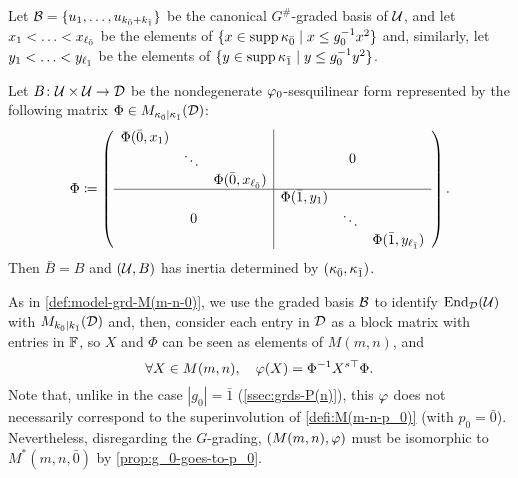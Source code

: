 Let $\mathcal B = \{u_1, \ldots, u_{k_{\bar{0}} + k_{\bar{1}}} \}$ be the canonical $G^\#$-graded basis of $\mathcal U$, and 
let $x_1 < \ldots < x_{\ell_{\bar{0}}}$ be the elements of $\{ x \in \operatorname{supp} \kappa_{\bar{0}} \mid x \leq g_0^{-1} x^2 \}$ and, similarly, let $y_1 < \ldots < y_{\ell_{\bar{1}}}$ be the elements of $\{ y \in \operatorname{supp} \kappa_{\bar{1}} \mid y \leq g_0^{-1} y^2 \}$. 

Let $B\colon \mathcal U\times \mathcal U \to \mathcal{D}$ be the nondegenerate $\varphi_0$-sesquilinear form represented by the following matrix $\Phi \in M_{\kappa_{\bar{0}} \mid \kappa_{\bar{1}}} (\mathcal{D})$:
\[\label{eq:puting-the-blocks-of-Phi-together}
    \sbox0{$\begin{matrix}
        \Phi(\bar 0, x_1)&& \\
        & \ddots &\\
        && \Phi(\bar 0, x_{\ell_\bz})
    \end{matrix}$}
    \sbox1{$\begin{matrix}
        \Phi(\bar 1, y_1)&& \\
        & \ddots &\\
        && \Phi(\bar 1, y_{\ell_\bo})
    \end{matrix}$}
    \Phi \coloneqq
    \left(\begin{array}{c|c}
            \usebox{0} & 0\\
            \hline
            0 & \usebox{1}
        \end{array}\right).
\]
%
Then $\bar B = B$ and $(\mathcal U, B)$ has inertia determined by $(\kappa_{\bar{0}}, \kappa_{\bar{1}})$. 

As in \cref{def:model-grd-M(m-n-0)}, we use the graded basis $\mathcal B$ to identify $\operatorname{End}_{\mathcal{D}}(\mathcal U)$ with $M_{k_{\bar{0}}|k_{\bar{1}}}(\mathcal{D})$ and, then, consider each entry in $\mathcal{D}$ as a block matrix with entries in $\mathbb{F}$, so $X$ and $\Phi$ can be seen as elements of $M(m,n)$, and
\[\label{eq:Phi-for-graded-osp}
    \forall X\in M(m,n), \quad \varphi(X) = \Phi^{-1} X^{s\top} \Phi.
\]
Note that, unlike in the case $|g_0| = \bar 1$ (\cref{ssec:grds-P(n)}), this $\varphi$ does not necessarily correspond to the superinvolution of \cref{defi:M(m-n-p_0)} (with $p_0 = \bar 0$). 
Nevertheless, disregarding the $G$-grading, $(M(m,n), \varphi)$ must be isomorphic to $M^*(m,n, \bar 0)$ by \cref{prop:g_0-goes-to-p_0}.

